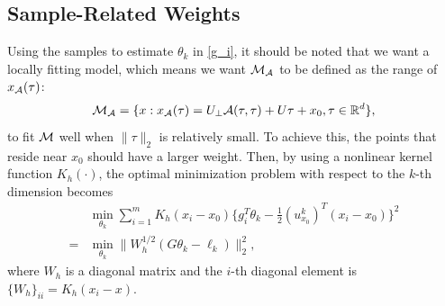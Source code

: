 \documentclass{article}
\theoremstyle{remark}
\begin{document}
\subsection{Sample-Related Weights}
Using the samples to estimate $\theta_k$ in \eqref{g_i}, it should be noted that we want a locally fitting model, which means we want ${\cal M_A}$ to be defined as the range of $x_{\cal A}(\tau)$:
\begin{equation}\label{M_A}
{\cal M_A} = \{x:x_{\cal A}(\tau) = U_{\perp} {\cal A} (\tau,\tau) + U \tau +x_0,\tau\in {\mathbb R}^d\},
\end{equation}
to fit $\cal M$ well when $\|\tau\|_2$ is relatively small. To achieve this, the points that reside near $x_0$ should have a larger weight.
Then, by using a nonlinear kernel function $K_h(\cdot)$, the optimal minimization problem with respect to the $k$-th dimension becomes
\begin{equation}\label{optimal}
\begin{aligned}
  &\min_{\theta_k} \sum_{i=1}^m K_h(x_i-x_0)\{ g_i^T \theta_k  - \frac{1}{2} {(u^k_{x_0})}^T (x_i -x_0)\}^2\\
= & \min_{\theta_k} \|W_h^{1/2}(G \theta_k-\ell_k) \|_2^2,
\end{aligned}
\end{equation}
where $W_h$ is a diagonal matrix and the $i$-th diagonal element is $\{{W_h}\}_{ii} = K_h(x_i-x)$. %
\end{document}
